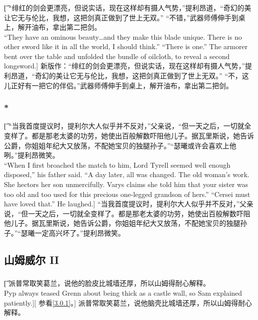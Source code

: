 \documentclass[12pt,a4paper]{article}
\begin{document}
\subsubsection{}\t[
	“绯红的剑会更漂亮，但说实话，现在这样却有摄人气势，”提利昂道，“奇幻的美让它无与伦比，我想，这把剑真正做到了世上无双。” “不错，”武器师傅伸手到桌上，解开油布，拿出第二把剑。\\
	“They have an ominous beauty\ldots and they make this blade unique. 
	There is no other sword like it in all the world, I should think.” “There is one.” The armorer bent over the table and unfolded the bundle of oilcloth, to reveal a second longsword.]
	新版作：“绯红的剑会更漂亮，但说实话，现在这样却有摄人气势，”提利昂道，“奇幻的美让它无与伦比，我想，这把剑真正做到了世上无双。” “不，这儿正好有一把它的伴侣。”武器师傅伸手到桌上，解开油布，拿出第二把剑。
	
\subsubsection{\color{red}*}\t[
	“当我首度提议时，提利尔大人似乎并不反对，”父亲说，“但一天之后，一切就全变样了。都是那老太婆的功劳，她使出百般解数吓阻他儿子。据瓦里斯说，她告诉公爵，你姐姐年纪大又放荡，不配她宝贝的独腿孙子。”“瑟曦或许会喜欢上他咧。”提利昂微笑。\\
	“When I first broached the match to him, Lord Tyrell seemed well enough disposed,” his father said. “A day later, all was changed. The old woman's work. She hectors her son unmercifully. Varys claims she told him that your sister was too old and too used for this precious one-legged grandson of hers.” “Cersei must have loved that.” He laughed.]
	“当我首度提议时，提利尔大人似乎并不反对，”父亲说，“但一天之后，一切就全变样了。都是那老太婆的功劳，她使出百般解数吓阻他儿子。据瓦里斯说，她告诉公爵，你姐姐年纪大又放荡，不配她宝贝的独腿孙子。”“瑟曦一定高兴坏了。”提利昂微笑。
	
	
\subsection{山姆威尔 II}
\subsubsection{}\t[
	派普常取笑葛兰，说他的脸皮比城墙还厚，所以山姆得耐心解释。\\
	Pyp always teased Grenn about being thick as a castle wall, so Sam explained patiently.][
	参看\ref{3.0.1}。]
	派普常取笑葛兰，说他脑壳比城墙还厚，所以山姆得耐心解释。
	
\end{document}
